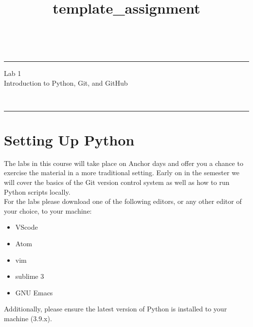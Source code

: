 \documentclass[a4paper,10pt]{article} %
\begin{document}

\title{template_assignment} %
\fancyhead[C]{}
\begin{minipage}{0.295\textwidth} %
\raggedright
\hfill\\ %
\medskip\hrule
\end{minipage}
\begin{minipage}{0.4\textwidth} %
\centering 
\large %
Lab 1\\ %
\normalsize %
Introduction to Python, Git, and GitHub\\
\end{minipage}
\begin{minipage}{0.295\textwidth} %
\raggedleft
\hfill\\ %
\medskip\hrule
\end{minipage}

\bigskip

\printbibliography

\section{Setting Up Python}

The labs in this course will take place on Anchor days and offer you a chance
to exercise the material in a more traditional setting. Early on in the
semester we will cover the basics of the Git version control system as well as
how to run Python scripts locally.\\

For the labs please download one of the following editors, or any other editor
of your choice, to your machine:

\begin{itemize}
  \item VScode
  \item Atom
  \item vim
  \item sublime 3
  \item GNU Emacs
\end{itemize}

Additionally, please ensure the latest version of Python is installed to your
machine (3.9.x).
\end{document}
